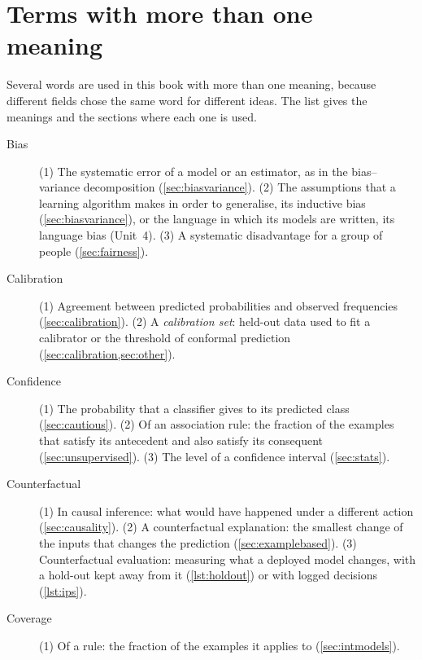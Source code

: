 \chapter*{Terms with more than one meaning}\label{ch:glossary}
{}

Several words are used in this book with more than one meaning, because different fields chose the
same word for different ideas. The list gives the meanings and the sections where each one is used.

\begin{description}
\item[Bias] (1) The systematic error of a model or an estimator, as in the bias--variance
decomposition (\cref{sec:biasvariance}). (2) The assumptions that a learning algorithm makes in order
to generalise, its inductive bias (\cref{sec:biasvariance}), or the language in which its models are
written, its language bias (Unit~4). (3) A systematic disadvantage for a group of people
(\cref{sec:fairness}).
\item[Calibration] (1) Agreement between predicted probabilities and observed frequencies
(\cref{sec:calibration}). (2) A \emph{calibration set}: held-out data used to fit a calibrator or the
threshold of conformal prediction (\cref{sec:calibration,sec:other}).
\item[Confidence] (1) The probability that a classifier gives to its predicted class
(\cref{sec:cautious}). (2) Of an association rule: the fraction of the examples that satisfy its
antecedent and also satisfy its consequent (\cref{sec:unsupervised}). (3) The level of a confidence
interval (\cref{sec:stats}).
\item[Counterfactual] (1) In causal inference: what would have happened under a different action
(\cref{sec:causality}). (2) A counterfactual explanation: the smallest change of the inputs that
changes the prediction (\cref{sec:examplebased}). (3) Counterfactual evaluation: measuring what a
deployed model changes, with a hold-out kept away from it (\cref{lst:holdout}) or with logged
decisions (\cref{lst:ips}).
\item[Coverage] (1) Of a rule: the fraction of the examples it applies to (\cref{sec:intmodels}).

\end{description}
